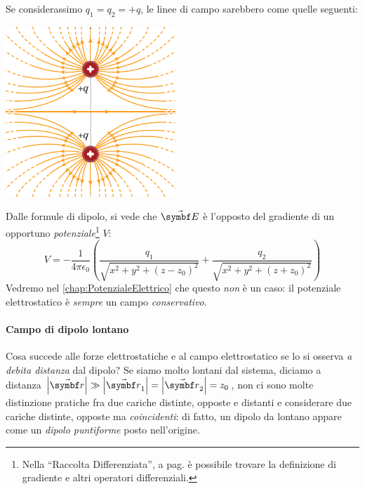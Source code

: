 Se considerassimo $q_1=q_2=+q$, le linee di campo sarebbero come quelle seguenti:
\begin{center}
	\includegraphics[width=0.48\textwidth]{images/chp1/chp1campodipolo2.pdf}
\end{center}
\begin{observe}
	Dalle formule di dipolo, si vede che $\vba{E}$ è l'opposto del gradiente di un opportuno \textit{potenziale}\footnote{Nella ``Raccolta Differenziata'', a pag. \pageref{gradiente} è possibile trovare la definizione di gradiente e altri operatori differenziali.} $V$:
	\begin{equation}
		V=-\frac{1}{4\pi\epsilon_0}\left(\frac{q_1}{\sqrt{x^2+y^2+(z-z_0)^2}}+\frac{q_2}{\sqrt{x^2+y^2+(z+z_0)^2}}\right)
	\end{equation}
Vedremo nel \autoref{chap:PotenzialeElettrico} che questo \textit{non} è un caso: il potenziale elettrostatico è \textit{sempre} un campo \textit{conservativo}.
\end{observe}
\paragraph{Campo di dipolo lontano}
Cosa succede alle forze elettrostatiche e al campo elettrostatico se lo si osserva \textit{a debita distanza} dal dipolo? Se siamo molto lontani dal sistema, diciamo a distanza $\abs{\vba{r}}\gg\abs{\vba{r}_1}=\abs{\vba{r}_2}=z_0$, non ci sono molte distinzione pratiche fra due cariche distinte, opposte e distanti e considerare due cariche distinte, opposte ma \textit{coincidenti}: di fatto, un dipolo da lontano appare come un \textit{dipolo puntiforme} posto nell'origine.

